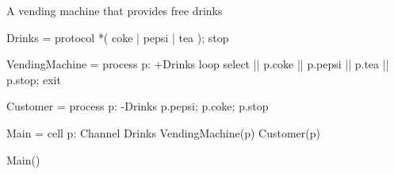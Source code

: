 A vending machine that provides free drinks
\begin{code}
Drinks = protocol { *( coke | pepsi | tea ); stop }

VendingMachine = process p: +Drinks
{
	loop select
	{
		|| p.coke
		|| p.pepsi
		|| p.tea
		|| p.stop; exit
	}
}

Customer = process p: -Drinks
{
	p.pepsi;
	p.coke;
	p.stop
}

Main = cell
{	
	p: Channel Drinks
	VendingMachine(p)
	Customer(p)
}

Main()
\end{code}
